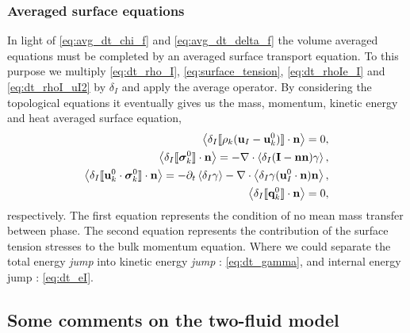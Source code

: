 \subsubsection{Averaged surface equations}
In light of \ref{eq:avg_dt_chi_f} and \ref{eq:avg_dt_delta_f} the volume averaged equations must be completed by an averaged surface transport equation.  
To this purpose we multiply \ref{eq:dt_rho_I}, \ref{eq:surface_tension}, \ref{eq:dt_rhoIe_I} and \ref{eq:dt_rhoI_uI2} by $\delta_I$ and apply the average operator.
By considering the topological equations it eventually gives us the mass, momentum, kinetic energy and heat averaged surface equation, 
\begin{align}
    \label{eq:dt_avg_rho_I}
    \left<\delta_I \llbracket \rho_k (\textbf{u}_I - \textbf{u}_k^0) \rrbracket \cdot \textbf{n}\right>
    = 0,\\
    \label{eq:dt_avg_uI}
    \left<\delta_I \llbracket \bm{\sigma}^0_k \rrbracket \cdot \textbf{n}\right>
    = - \mathbf{\nabla}\cdot \left<\delta_I (\textbf{I} - \textbf{nn}) \gamma\right>,\\
    \label{eq:dt_avg_gamma}
    \left<\delta_I \llbracket \textbf{u}_k^0 \cdot \bm{\sigma}^0_k \rrbracket \cdot \textbf{n}\right>
    = - \partial_t \left<\delta_I \gamma\right>
    - \mathbf{\nabla}\cdot \left<\delta_I \gamma (\textbf{u}_{I}^0 \cdot \textbf{n})\textbf{n} \right>,\\
    \label{eq:dt_avg_eI}
    \left<\delta_I \llbracket \textbf{q}^0_k \rrbracket \cdot \textbf{n}\right>
     = 0,
\end{align}
respectively. 
The first equation represents the condition of no mean mass transfer between phase.
The second equation represents the contribution of the surface tension stresses to the bulk momentum equation.
Where we could separate the total energy \textit{jump} into kinetic energy \textit{jump} : \ref{eq:dt_gamma}, and internal energy jump : \ref{eq:dt_eI}. 

\subsection{Some comments on the two-fluid model}

